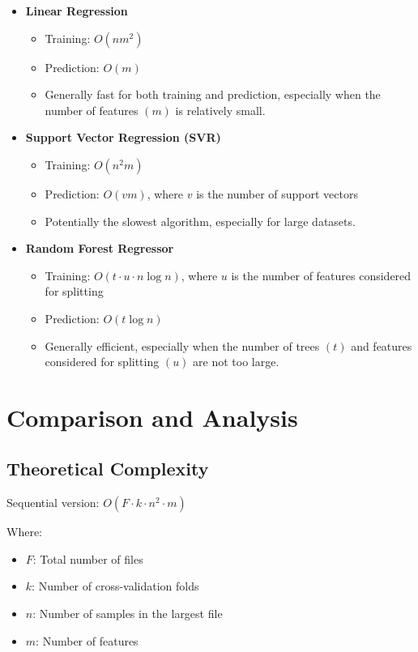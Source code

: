 \documentclass[11pt,a4paper]{article}
\begin{document}
\begin{itemize}
    \item \textbf{Linear Regression}
    \begin{itemize}
        \item Training: $O(nm^2)$
        \item Prediction: $O(m)$
        \item Generally fast for both training and prediction, especially when the number of features $(m)$ is relatively small.
    \end{itemize}
    
    \item \textbf{Support Vector Regression (SVR)}
    \begin{itemize}
        \item Training: $O(n^2m)$
        \item Prediction: $O(vm)$, where $v$ is the number of support vectors
        \item Potentially the slowest algorithm, especially for large datasets.
    \end{itemize}
    
    \item \textbf{Random Forest Regressor}
    \begin{itemize}
        \item Training: $O(t \cdot u \cdot n \log n)$, where $u$ is the number of features considered for splitting
        \item Prediction: $O(t \log n)$
        \item Generally efficient, especially when the number of trees $(t)$ and features considered for splitting $(u)$ are not too large.
    \end{itemize}
\end{itemize}

\section{Comparison and Analysis}

\subsection{Theoretical Complexity}
Sequential version: $O(F \cdot k \cdot n^2 \cdot m)$

Where:
\begin{itemize}
    \item $F$: Total number of files
    \item $k$: Number of cross-validation folds
    \item $n$: Number of samples in the largest file
    \item $m$: Number of features
\end{itemize}
\end{document}
